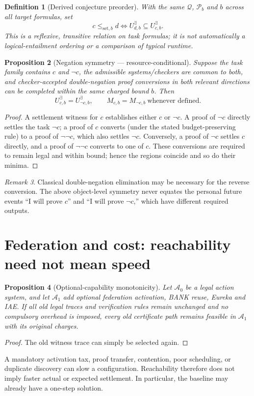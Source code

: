 \documentclass[11pt,letterpaper]{article}
\newtheorem{definition}{Definition}[section]
\newtheorem{proposition}[definition]{Proposition}
\theoremstyle{remark}
\newtheorem{remark}[definition]{Remark}
\begin{document}
\begin{definition}[Derived conjecture preorder]\label{def:cpre}
With the same $\mathcal Q$, $\mathcal P_b$ and $b$ across all target formulas, set
\[ c\le_{\mathrm{set},b}d\iff U^{\exists}_{d,b}\subseteq U^{\exists}_{c,b}.\]
This is a reflexive, transitive relation on task formulas; it is not automatically a logical-entailment ordering or a comparison of typical runtime.
\end{definition}
\begin{proposition}[Negation symmetry --- resource-conditional]\label{prop:sym}
Suppose the task family contains $c$ and $\neg c$, the admissible systems/checkers are common to both, and checker-accepted double-negation proof conversions in \emph{both relevant directions} can be completed within the same charged bound $b$. Then
\[U^{\exists}_{c,b}=U^{\exists}_{\neg c,b},\qquad M_{c,b}=M_{\neg c,b}\ \text{whenever defined}.\]
\end{proposition}
\begin{proof}
A settlement witness for $c$ establishes either $c$ or $\neg c$. A proof of $\neg c$ directly settles the task $\neg c$; a proof of $c$ converts (under the stated budget-preserving rule) to a proof of $\neg\neg c$, which also settles $\neg c$. Conversely, a proof of $\neg c$ settles $c$ directly, and a proof of $\neg\neg c$ converts to one of $c$. These conversions are required to remain legal and within bound; hence the regions coincide and so do their minima.
\end{proof}
\begin{remark}
Classical double-negation elimination may be necessary for the reverse conversion. The above object-level symmetry never equates the personal future events ``I will prove $c$'' and ``I will prove $\neg c$,'' which have different required outputs.
\end{remark}

\section{Federation and cost: reachability need not mean speed}
\begin{proposition}[Optional-capability monotonicity]\label{prop:cap}
Let $\mathcal A_0$ be a legal action system, and let $\mathcal A_1$ add optional federation activation, BANK reuse, Eureka and IAE. If all old legal traces and verification rules remain unchanged and no compulsory overhead is imposed, every old certificate path remains feasible in $\mathcal A_1$ with its original charges.
\end{proposition}
\begin{proof}The old witness trace can simply be selected again.\end{proof}
A mandatory activation tax, proof transfer, contention, poor scheduling, or duplicate discovery can slow a configuration. Reachability therefore does not imply faster actual or expected settlement. In particular, the baseline may already have a one-step solution.
\end{document}
